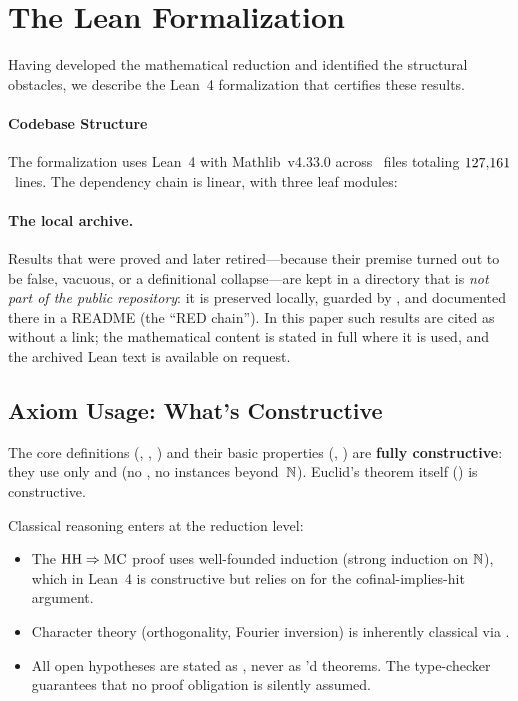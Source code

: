 \section{The Lean Formalization}
\label{sec:lean}

Having developed the mathematical reduction and identified the
structural obstacles, we describe the Lean~4 formalization that
certifies these results.

\paragraph{Codebase Structure}

The formalization uses Lean~4 with Mathlib~v4.33.0 across \EMFileCount~files
totaling $127{,}161$~lines.  The dependency chain is linear, with
three leaf modules:

\footnotesize

\normalsize

\paragraph{The local archive.}
Results that were proved and later retired---because their premise turned
out to be false, vacuous, or a definitional collapse---are kept in a
directory  that is \emph{not part of the public
repository}: it is preserved locally, guarded by , and
documented there in a README (the ``RED chain'').  In this paper such
results are cited as  without a link; the mathematical
content is stated in full where it is used, and the archived Lean text is
available on request.

\subsection{Axiom Usage: What's Constructive}

The core definitions (, , ) and
their basic properties (, )
are \textbf{fully constructive}: they use only  and
 (no , no
 instances beyond~$\mathbb{N}$).  Euclid's theorem
itself () is constructive.

Classical reasoning enters at the reduction level:
\begin{itemize}[nosep]
\item The $\mathrm{HH} \Rightarrow \mathrm{MC}$ proof uses well-founded induction
  (strong induction on $\mathbb{N}$), which in Lean~4 is constructive but
  relies on  for the
  cofinal-implies-hit argument.
\item Character theory (orthogonality, Fourier inversion) is
  inherently classical via .
\item All open hypotheses are stated as ,
  never as 'd theorems.  The type-checker guarantees
  that no proof obligation is silently assumed.
\end{itemize}

